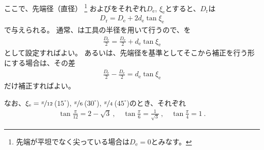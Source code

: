 ここで、\nameTaperEndMill 先端径（直径）
\footnote{先端が平坦でなく尖っている場合は$D_\mathrm e = 0$とみなす。}
および\TaperEndMillAngle をそれぞれ$D_\mathrm e$, $\xi_\mathrm e$とすると、\TaperEndMillReferenceDiameter$D_\mathrm r$は
\begin{align*}
  D_\mathrm r = D_\mathrm e+2d_\mathrm e\tan\xi_\mathrm e
\end{align*}
で与えられる。
通常、\TDCorrection は工具の半径を用いて行うので、\indexTDTaperEndMill\nameToolDiameter を
\begin{align*}
  \frac{D_\mathrm r}2 = \frac{D_\mathrm e}2+d_\mathrm e\tan\xi_\mathrm e
\end{align*}
として設定すればよい。
あるいは、\nameTaperEndMill 先端径を基準としてそこから補正を行う形にする場合は、その差
\begin{align*}
  \frac{D_\mathrm r}2-\frac{D_\mathrm e}2 = d_\mathrm e\tan\xi_\mathrm e
\end{align*}
だけ補正すればよい。
\begin{hosoku}
なお、$\xi_\mathrm e = \nicefrac\pi{12}$\,($15^\circ$), $\nicefrac\pi6$\,($30^\circ$), $\nicefrac\pi4$\,($45^\circ$)のとき、それぞれ
\begin{align*}
  \tan\frac\pi{12} = 2-\sqrt3\ , \quad
  \tan\frac\pi6 = \frac1{\sqrt3}\ , \quad
  \tan\frac\pi4 = 1\ .
\end{align*}
\end{hosoku}



